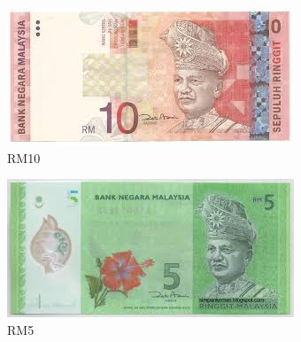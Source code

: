 \documentclass{article}
\begin{document}
\listoffigures

\begin{figure}[h]
    \centering
    \includegraphics[width=0.7\linewidth]{ten}
    \caption{RM10}
    \label{fig:ten}
\end{figure}

\begin{figure}[h]
    \centering
    \includegraphics[width=0.7\linewidth]{five}
    \caption{RM5}
    \label{fig:five}
\end{figure}
\end{document}
